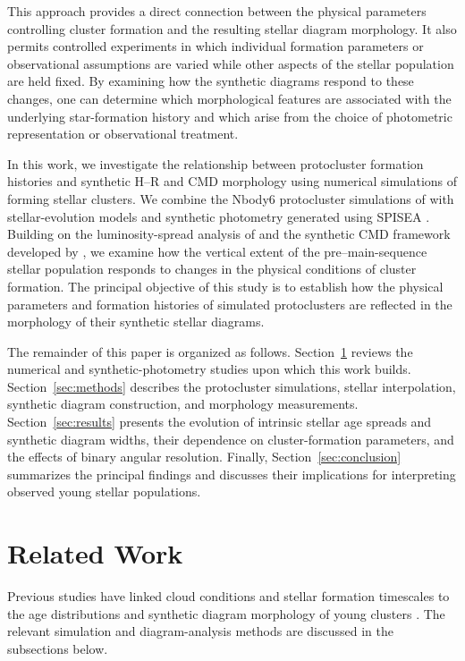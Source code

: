 \documentclass[linenumbers, twocolumn]{aastex631}
\begin{document}
This approach provides a direct connection between the physical parameters controlling cluster formation and the resulting stellar diagram morphology. It also permits controlled experiments in which individual formation parameters or observational assumptions are varied while other aspects of the stellar population are held fixed. By examining how the synthetic diagrams respond to these changes, one can determine which morphological features are associated with the underlying star-formation history and which arise from the choice of photometric representation or observational treatment.

In this work, we investigate the relationship between protocluster formation histories and synthetic H--R and CMD morphology using numerical simulations of forming stellar clusters. We combine the Nbody6 protocluster simulations of \citet{Farias2019} with stellar-evolution models and synthetic photometry generated using SPISEA \citep{Hosek2020}. Building on the luminosity-spread analysis of \citet{Masegian2021} and the synthetic CMD framework developed by \citet{Zhang2024}, we examine how the vertical extent of the pre--main-sequence stellar population responds to changes in the physical conditions of cluster formation. The principal objective of this study is to establish how the physical parameters and formation histories of simulated protoclusters are reflected in the morphology of their synthetic stellar diagrams.

The remainder of this paper is organized as follows. Section~\ref{sec:related} reviews the numerical and synthetic-photometry studies upon which this work builds. Section~\ref{sec:methods} describes the protocluster simulations, stellar interpolation, synthetic diagram construction, and morphology measurements. Section~\ref{sec:results} presents the evolution of intrinsic stellar age spreads and synthetic diagram widths, their dependence on cluster-formation parameters, and the effects of binary angular resolution. Finally, Section~\ref{sec:conclusion} summarizes the principal findings and discusses their implications for interpreting observed young stellar populations.





\section{Related Work}\label{sec:related}

Previous studies have linked cloud conditions and stellar formation timescales to the age distributions and synthetic diagram morphology of young clusters \citep{Farias2019,Masegian2021,Zhang2024}. The relevant simulation and diagram-analysis methods are discussed in the subsections below.
\end{document}
